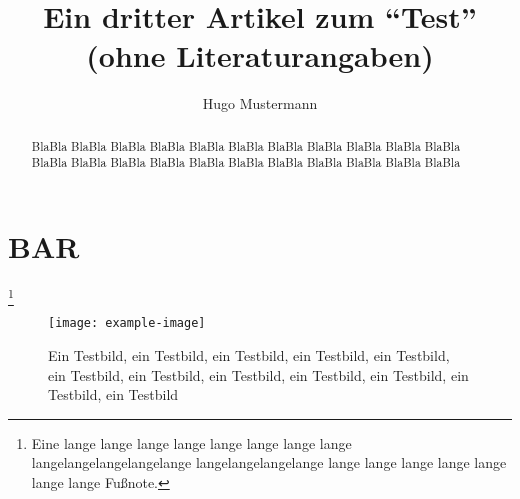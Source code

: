 \documentclass{dtk2}
\author{Hugo Mustermann}
\begin{document}
\title{Ein dritter Artikel zum "`Test"' (ohne Literaturangaben)}

\maketitle

\begin{abstract}
BlaBla BlaBla BlaBla BlaBla BlaBla BlaBla BlaBla BlaBla BlaBla BlaBla BlaBla
BlaBla BlaBla BlaBla BlaBla BlaBla BlaBla BlaBla BlaBla BlaBla BlaBla BlaBla
\end{abstract}

\section{BAR}

\blindtext\footnote*{Eine lange lange lange lange lange lange lange lange
\mbox{langelangelangelangelange} \mbox{langelangelangelange} lange lange lange
lange lange lange lange
Fußnote.}%

\begin{figure}[p] \centering
  \texttt{[image: example-image]}
  \caption{Ein Testbild, ein Testbild, ein Testbild, ein Testbild, ein
  Testbild, ein Testbild, ein Testbild, ein Testbild, ein Testbild, ein
  Testbild, ein Testbild, ein Testbild}
\end{figure}
\end{document}
